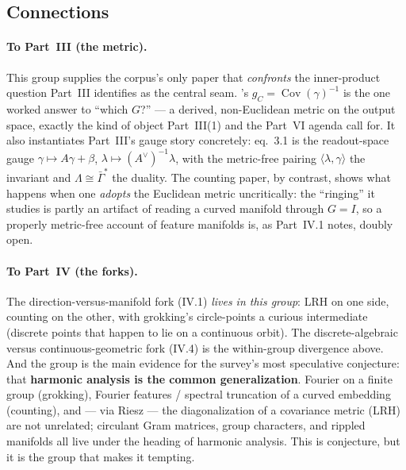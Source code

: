 \subsection*{Connections}

\paragraph*{To Part~III (the metric).}
This group supplies the corpus's only paper that \emph{confronts} the inner-product question Part~III identifies as the central seam. \textcite{linear-representation-hypothesis-geometry}'s $g_C=\operatorname{Cov}(\gamma)^{-1}$ is the one worked answer to ``which $G$?'' --- a derived, non-Euclidean metric on the output space, exactly the kind of object Part~III(1) and the Part~VI agenda call for. It also instantiates Part~III's gauge story concretely: eq.~3.1 is the readout-space gauge $\gamma\mapsto A\gamma+\beta$, $\lambda\mapsto(A^{\vee})^{-1}\lambda$, with the metric-free pairing $\langle\lambda,\gamma\rangle$ the invariant and $\Lambda\cong\bar\Gamma^{*}$ the duality. The counting paper, by contrast, shows what happens when one \emph{adopts} the Euclidean metric uncritically: the ``ringing'' it studies is partly an artifact of reading a curved manifold through $G=I$, so a properly metric-free account of feature manifolds is, as Part~IV.1 notes, doubly open.

\paragraph*{To Part~IV (the forks).}
The direction-versus-manifold fork (IV.1) \emph{lives in this group}: LRH on one side, counting on the other, with grokking's circle-points a curious intermediate (discrete points that happen to lie on a continuous orbit). The discrete-algebraic versus continuous-geometric fork (IV.4) is the within-group divergence above. And the group is the main evidence for the survey's most speculative conjecture: that \textbf{harmonic analysis is the common generalization}. Fourier on a finite group (grokking), Fourier features / spectral truncation of a curved embedding (counting), and --- via Riesz --- the diagonalization of a covariance metric (LRH) are not unrelated; circulant Gram matrices, group characters, and rippled manifolds all live under the heading of harmonic analysis. This is conjecture, but it is the group that makes it tempting.

